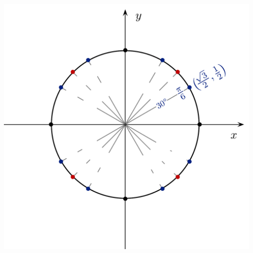 \documentclass[12pt]{article}
\begin{document}
\begin{enumerate}
\includegraphics[scale=0.5]{blank-unit-circle.pdf}
\end{enumerate}
\end{document}
